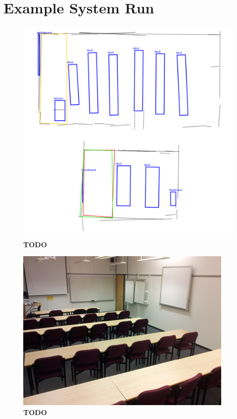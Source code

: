 \documentclass[letterpaper]{article}
\begin{document}
\section{Example System Run}\label{sec:example}

\begin{figure}[t]
  \includegraphics[width=\columnwidth]{images/worked-example-rooms.png}
  \caption{\textbf{TODO}}
  \label{fig:rooms}
\end{figure}

\begin{figure}[t]
  \includegraphics[width=\columnwidth]{images/ug40.png}
  \caption{\textbf{TODO}}
  \label{fig:ug40}
\end{figure}
\end{document}

